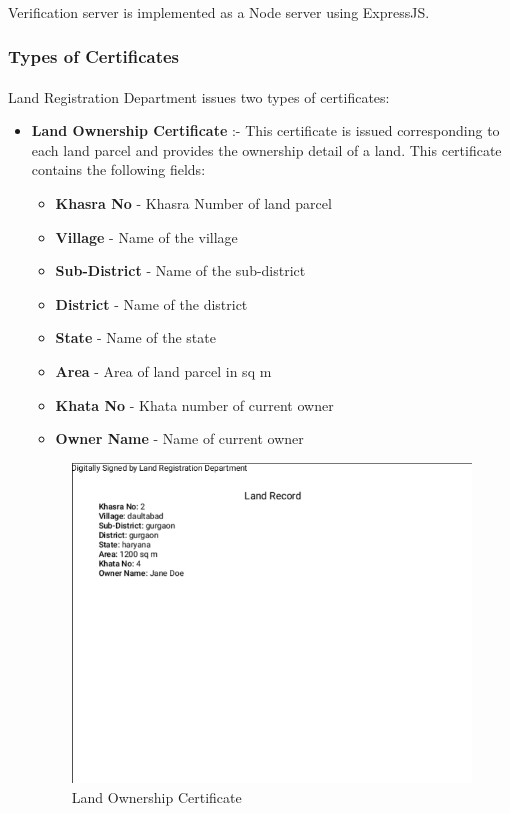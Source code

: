 \documentclass{article}
\begin{document}
        \paragraph{}
        Verification server is implemented as a Node server using ExpressJS.
        
        \subsubsection{Types of Certificates}
        \paragraph{}
        Land Registration Department issues two types of certificates:
        \begin{itemize}
            \item \textbf{Land Ownership Certificate} :- This certificate is issued corresponding to each land parcel and provides the ownership detail of a land. This certificate contains the following fields:
             \begin{itemize}
                \item \textbf{Khasra No} - Khasra Number of land parcel
                \item \textbf{Village} - Name of the village
                \item \textbf{Sub-District} - Name of the sub-district 
                \item \textbf{District} - Name of the district
                \item \textbf{State} - Name of the state
                \item \textbf{Area} - Area of land parcel in sq m
                \item \textbf{Khata No} - Khata number of current owner
                \item \textbf{Owner Name} - Name of current owner
            \end{itemize}
            \begin{figure}[htbp]
                \includegraphics[scale=0.5, frame]{landcertificate.png}
                \centering
                \caption{Land Ownership Certificate}
            \end{figure}


\end{itemize}
\end{document}
